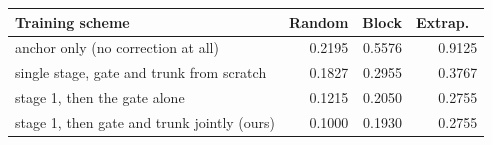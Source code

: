 \small
\begin{tabular}{lrrr}\toprule
Training scheme & Random & Block & Extrap.\ \\\midrule
anchor only (no correction at all) & 0.2195 & 0.5576 & 0.9125 \\
single stage, gate and trunk from scratch & 0.1827 & 0.2955 & 0.3767 \\
stage 1, then the gate alone & 0.1215 & 0.2050 & 0.2755 \\
stage 1, then gate and trunk jointly (ours) & 0.1000 & 0.1930 & 0.2755 \\
\bottomrule\end{tabular}
